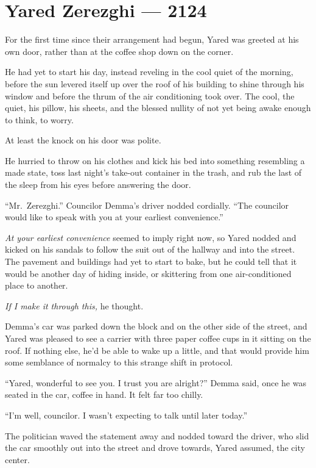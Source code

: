 \hypertarget{yared-zerezghi-2124}{%
\chapter{Yared Zerezghi — 2124}\label{yared-zerezghi-2124}}

For the first time since their arrangement had begun, Yared was greeted at his own door, rather than at the coffee shop down on the corner.

He had yet to start his day, instead reveling in the cool quiet of the morning, before the sun levered itself up over the roof of his building to shine through his window and before the thrum of the air conditioning took over. The cool, the quiet, his pillow, his sheets, and the blessed nullity of not yet being awake enough to think, to worry.

At least the knock on his door was polite.

He hurried to throw on his clothes and kick his bed into something resembling a made state, toss last night's take-out container in the trash, and rub the last of the sleep from his eyes before answering the door.

``Mr.~Zerezghi.'' Councilor Demma's driver nodded cordially. ``The councilor would like to speak with you at your earliest convenience.''

\emph{At your earliest convenience} seemed to imply right now, so Yared nodded and kicked on his sandals to follow the suit out of the hallway and into the street. The pavement and buildings had yet to start to bake, but he could tell that it would be another day of hiding inside, or skittering from one air-conditioned place to another.

\emph{If I make it through this,} he thought.

Demma's car was parked down the block and on the other side of the street, and Yared was pleased to see a carrier with three paper coffee cups in it sitting on the roof. If nothing else, he'd be able to wake up a little, and that would provide him some semblance of normalcy to this strange shift in protocol.

``Yared, wonderful to see you. I trust you are alright?'' Demma said, once he was seated in the car, coffee in hand. It felt far too chilly.

``I'm well, councilor. I wasn't expecting to talk until later today.''

The politician waved the statement away and nodded toward the driver, who slid the car smoothly out into the street and drove towards, Yared assumed, the city center.

